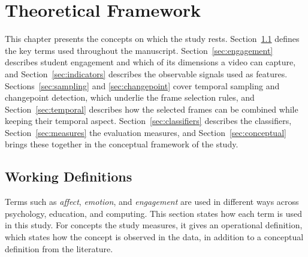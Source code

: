 %
%
%

\chapter{Theoretical Framework}
\label{sec:theoframework}

This chapter presents the concepts on which the study rests. Section~\ref{sec:definitions} defines the key terms used throughout the manuscript. Section~\ref{sec:engagement} describes student engagement and which of its dimensions a video can capture, and Section~\ref{sec:indicators} describes the observable signals used as features. Sections~\ref{sec:sampling} and \ref{sec:changepoint} cover temporal sampling and changepoint detection, which underlie the frame selection rules, and Section~\ref{sec:temporal} describes how the selected frames can be combined while keeping their temporal aspect. Section~\ref{sec:classifiers} describes the classifiers, Section~\ref{sec:measures} the evaluation measures, and Section~\ref{sec:conceptual} brings these together in the conceptual framework of the study.



\section{Working Definitions}
\label{sec:definitions}

Terms such as \emph{affect}, \emph{emotion}, and \emph{engagement} are used in different ways across psychology, education, and computing. This section states how each term is used in this study. For concepts the study measures, it gives an operational definition, which states how the concept is observed in the data, in addition to a conceptual definition from the literature.

